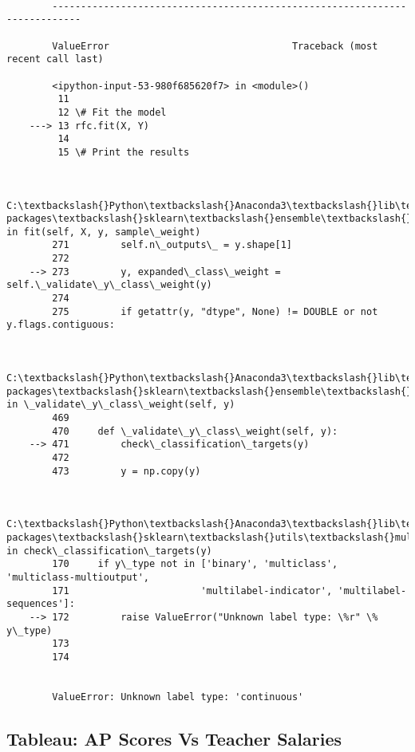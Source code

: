 \documentclass[11pt]{article}
\begin{document}
    \begin{Verbatim}[commandchars=\\\{\}]

        ---------------------------------------------------------------------------

        ValueError                                Traceback (most recent call last)

        <ipython-input-53-980f685620f7> in <module>()
         11 
         12 \# Fit the model
    ---> 13 rfc.fit(X, Y)
         14 
         15 \# Print the results
    

        C:\textbackslash{}Python\textbackslash{}Anaconda3\textbackslash{}lib\textbackslash{}site-packages\textbackslash{}sklearn\textbackslash{}ensemble\textbackslash{}forest.py in fit(self, X, y, sample\_weight)
        271         self.n\_outputs\_ = y.shape[1]
        272 
    --> 273         y, expanded\_class\_weight = self.\_validate\_y\_class\_weight(y)
        274 
        275         if getattr(y, "dtype", None) != DOUBLE or not y.flags.contiguous:
    

        C:\textbackslash{}Python\textbackslash{}Anaconda3\textbackslash{}lib\textbackslash{}site-packages\textbackslash{}sklearn\textbackslash{}ensemble\textbackslash{}forest.py in \_validate\_y\_class\_weight(self, y)
        469 
        470     def \_validate\_y\_class\_weight(self, y):
    --> 471         check\_classification\_targets(y)
        472 
        473         y = np.copy(y)
    

        C:\textbackslash{}Python\textbackslash{}Anaconda3\textbackslash{}lib\textbackslash{}site-packages\textbackslash{}sklearn\textbackslash{}utils\textbackslash{}multiclass.py in check\_classification\_targets(y)
        170     if y\_type not in ['binary', 'multiclass', 'multiclass-multioutput',
        171                       'multilabel-indicator', 'multilabel-sequences']:
    --> 172         raise ValueError("Unknown label type: \%r" \% y\_type)
        173 
        174 
    

        ValueError: Unknown label type: 'continuous'

    \end{Verbatim}

    \subsection{Tableau: AP Scores Vs Teacher
Salaries}\label{tableau-ap-scores-vs-teacher-salaries}
\end{document}
